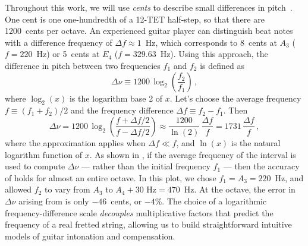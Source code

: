 Throughout this work, we will use \emph{cents} to describe small differences in pitch~\cite{ref:hall1985see,ref:hall1988anl,ref:krantz2000cie,ref:jedrzejewski2008gds,ref:varieschi2010icf,ref:durfee2015pms}. One cent is one one-hundredth of a 12-TET half-step, so that there are 1200~cents per octave. An experienced guitar player can distinguish beat notes with a difference frequency of $\Delta f \approx 1$~Hz, which corresponds to 8~cents at $A_3$ ($f = 220$~Hz) or 5~cents at $E_4$ ($f = 329.63$~Hz). Using this approach, the difference in pitch between two frequencies $f_1$ and $f_2$ is defined as
 \begin{equation} \label{eqn:cents_def}
\Delta \nu \equiv 1200\, \log_2\left(\frac{f_2}{f_1}\right)\, ,
 \end{equation}
where $\log_2(x)$ is the logarithm base 2 of $x$. Let's choose the average frequency $f \equiv (f_1 + f_2) / 2$ and the frequency difference $\Delta f \equiv f_2 - f_1$. Then
 \begin{equation} \label{eqn:cents_approx}
\Delta \nu = 1200\, \log_2\left(\frac{f + \Delta f / 2}{f - \Delta f /2}\right) \approx \frac{1200}{\ln(2)}\, \frac{\Delta f}{f} = 1731\, \frac{\Delta f}{f}\, ,
 \end{equation}
where the approximation applies when $\Delta f \ll f$, and $\ln(x)$ is the natural logarithm function of $x$. As shown in , if the average frequency of the interval is used to compute $\Delta \nu$ --- rather than the initial frequency $f_1$ --- then the accuracy of  holds for almost an entire octave. In this plot, we chose $f_1 = A_3 = 220$~Hz, and allowed $f_2$ to vary from $A_3$ to $A_4 + 30 \textrm{ Hz} = 470$~Hz. At the octave, the error in $\Delta \nu$ arising from  is only $-46$~cents, or $-4$\%. The choice of a logarithmic frequency-difference scale \emph{decouples} multiplicative factors that predict the frequency of a real fretted string, allowing us to build straightforward intuitive models of guitar intonation and compensation.

